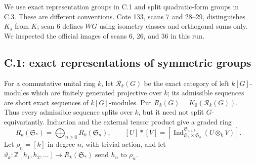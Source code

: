 \label{C:section}

We use exact representation groups in C.1 and split quadratic-form groups in
C.3.  These are different conventions.  Cote 133, scans 7 and 28--29, distinguishes
$K_s$ from $K$; scan 6 defines $WG$ using isometry classes and orthogonal sums
only.  We inspected the official images of scans 6, 26, and 36 in this run.

\subsection{C.1: exact representations of symmetric groups}

For a commutative unital ring $k$, let $\mathcal R_k(G)$ be the exact category
of left $k[G]$-modules which are finitely generated projective over $k$; its
admissible sequences are short exact sequences of $k[G]$-modules.  Put
$R_k(G)=K_0(\mathcal R_k(G))$.  Thus every admissible sequence splits over $k$,
but it need not split $G$-equivariantly.  Induction and the external tensor
product give a graded ring
\[
 R_k(\mathfrak S_*)=\bigoplus_{n\geq0}R_k(\mathfrak S_n),\qquad
 [U]*[V]=[\operatorname{Ind}_{\mathfrak S_a\times\mathfrak S_b}^{\mathfrak S_{a+b}}
 (U\otimes_k V)].
\]
Let $\rho_n=[k]$ in degree $n$, with trivial action, and let
$\vartheta_k:\mathbb Z[h_1,h_2,\ldots]\longrightarrow R_k(\mathfrak S_*)$
send $h_n$ to $\rho_n$.

